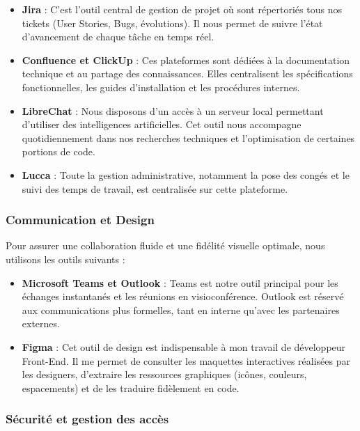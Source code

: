 \documentclass{article}
\begin{document}
\begin{itemize}
    \item \textbf{Jira} : C'est l'outil central de gestion de projet où sont répertoriés tous nos tickets (User Stories, Bugs, évolutions). Il nous permet de suivre l'état d'avancement de chaque tâche en temps réel.
    
    \item \textbf{Confluence et ClickUp} : Ces plateformes sont dédiées à la documentation technique et au partage des connaissances. Elles centralisent les spécifications fonctionnelles, les guides d'installation et les procédures internes.

    \item \textbf{LibreChat} : Nous disposons d'un accès à un serveur local permettant d'utiliser des intelligences artificielles. Cet outil nous accompagne quotidiennement dans nos recherches techniques et l'optimisation de certaines portions de code.

    \item \textbf{Lucca} : Toute la gestion administrative, notamment la pose des congés et le suivi des temps de travail, est centralisée sur cette plateforme.
\end{itemize}

\subsubsection{Communication et Design}

Pour assurer une collaboration fluide et une fidélité visuelle optimale, nous utilisons les outils suivants :

\begin{itemize}
    \item \textbf{Microsoft Teams et Outlook} : Teams est notre outil principal pour les échanges instantanés et les réunions en visioconférence. Outlook est réservé aux communications plus formelles, tant en interne qu'avec les partenaires externes.
    
    \item \textbf{Figma} : Cet outil de design est indispensable à mon travail de développeur Front-End. Il me permet de consulter les maquettes interactives réalisées par les designers, d'extraire les ressources graphiques (icônes, couleurs, espacements) et de les traduire fidèlement en code.
\end{itemize}

\subsubsection{Sécurité et gestion des accès}
\end{document}

